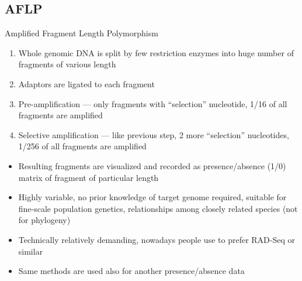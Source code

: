 \documentclass[compress, xelatex, 11pt, xcolor=svgnames, aspectratio=169,
	hyperref={
		bookmarks=true,
		unicode=true,
		colorlinks=true,
		pdftitle={Molecular data in R},
		plainpages=false,
		pdfauthor={Vojtech Zeisek},
		pdfsubject={Course about phylogeny and evolution in R},
		pdfcreator={XeLaTeX},
		pdfkeywords={R, evolution, phylogeny, molecular data},
		linkcolor=Crimson, %
		anchorcolor=Magenta, %
		citecolor=Magenta, %
		filecolor=Magenta, %
		menucolor=Magenta, %
		urlcolor=DodgerBlue, %
		},
	url={hyphens, lowtilde} %
	]{beamer}
\begin{document}
\subsection{AFLP}

\begin{frame}{Amplified Fragment Length Polymorphism}
	\begin{enumerate}
		\item Whole genomic DNA is split by few restriction enzymes into huge number of fragments of various length
		\item Adaptors are ligated to each fragment
		\item Pre-amplification --- only fragments with \enquote{selection} nucleotide, 1/16 of all fragments are amplified
		\item Selective amplification --- like previous step, 2 more \enquote{selection} nucleotides, 1/256 of all fragments are amplified
	\end{enumerate}
	\begin{itemize}
		\item Resulting fragments are visualized and recorded as presence/absence (1/0) matrix of fragment of particular length
		\item Highly variable, no prior knowledge of target genome required, suitable for fine-scale population genetics, relationships among closely related species (not for phylogeny)
		\item Technically relatively demanding, nowadays people use to prefer RAD-Seq or similar
		\item Same methods are used also for another presence/absence data
	\end{itemize}
\end{frame}
\end{document}
